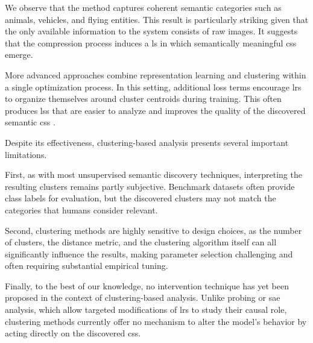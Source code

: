 

We observe that the method captures coherent semantic categories such as animals, vehicles, and flying entities.
This result is particularly striking given that the only available information to the system consists of raw images.
It suggests that the compression process induces a \gls{ls} in which semantically meaningful \glspl{cs} emerge.

More advanced approaches combine representation learning and clustering within a single optimization process.
In this setting, additional loss terms encourage \glspl{lr} to organize themselves around cluster centroids during training.
This often produces \glspl{ls} that are easier to analyze and improves the quality of the discovered semantic \glspl{cs} \parencite{guo_improved_2017, miklautz_breaking_2024}.

Despite its effectiveness, clustering-based analysis presents several important limitations.

First, as with most unsupervised semantic discovery techniques, interpreting the resulting clusters remains partly subjective.
Benchmark datasets often provide class labels for evaluation, but the discovered clusters may not match the categories that humans consider relevant. 

Second, clustering methods are highly sensitive to design choices, as the number of clusters, the distance metric, and the clustering algorithm itself can all significantly influence the results, making parameter selection challenging and often requiring substantial empirical tuning.

Finally, to the best of our knowledge, no intervention technique has yet been proposed in the context of clustering-based analysis.
Unlike probing or \gls{sae} analysis, which allow targeted modifications of \glspl{lr} to study their causal role, clustering methods currently offer no mechanism to alter the model's behavior by acting directly on the discovered \glspl{cs}.
